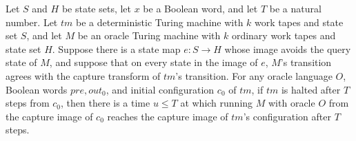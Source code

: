 \begin{theorem}
\label{Turing.OracleTM.capture_reaches_qQuery}
\leanok
{}
Let $S$ and $H$ be state sets, let $x$ be a Boolean word, and let $T$ be a natural
number. Let $tm$ be a deterministic Turing machine with $k$ work tapes and state set
$S$, and let $M$ be an oracle Turing machine with $k$ ordinary work tapes and state set
$H$. Suppose there is a state map $e:S\to H$ whose image avoids the query state of $M$,
and suppose that on every state in the image of $e$, $M$'s transition agrees with the
capture transform of $tm$'s transition. For any oracle language $O$, Boolean words
$pre,out_0$, and initial configuration $c_0$ of $tm$, if $tm$ is halted after $T$ steps
from $c_0$, then there is a time $u\le T$ at which running $M$ with oracle $O$ from the
capture image of $c_0$ reaches the capture image of $tm$'s configuration after $T$
steps.
\end{theorem}
